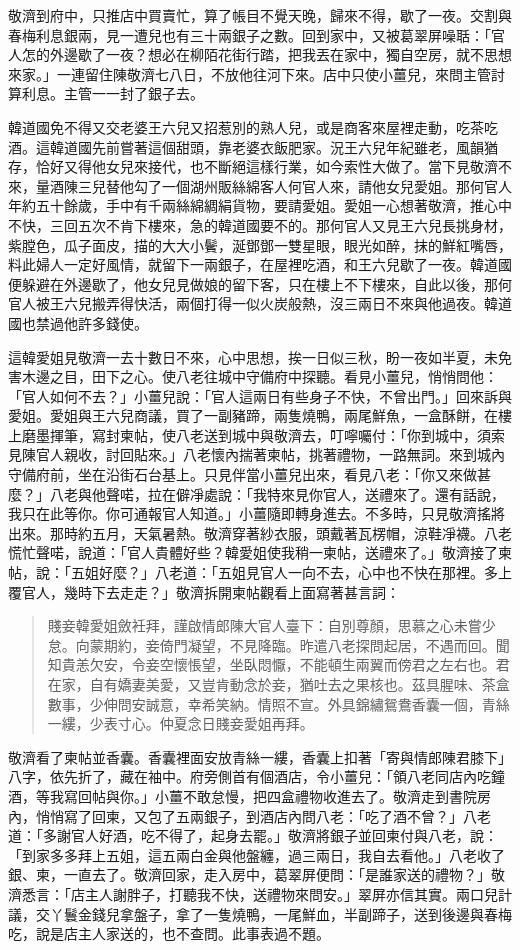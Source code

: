 敬濟到府中，只推店中買賣忙，算了帳目不覺天晚，歸來不得，歇了一夜。交割與春梅利息銀兩，見一遭兒也有三十兩銀子之數。回到家中，又被葛翠屏噪聒：「官人怎的外邊歇了一夜？想必在柳陌花街行踏，把我丟在家中，獨自空房，就不思想來家。」一連留住陳敬濟七八日，不放他往河下來。店中只使小薑兒，來問主管討算利息。主管一一封了銀子去。

韓道國免不得又交老婆王六兒又招惹別的熟人兒，或是商客來屋裡走動，吃茶吃酒。這韓道國先前嘗著這個甜頭，靠老婆衣飯肥家。況王六兒年紀雖老，風韻猶存，恰好又得他女兒來接代，也不斷絕這樣行業，如今索性大做了。當下見敬濟不來，量酒陳三兒替他勾了一個湖州販絲綿客人何官人來，請他女兒愛姐。那何官人年約五十餘歲，手中有千兩絲綿綢絹貨物，要請愛姐。愛姐一心想著敬濟，推心中不快，三回五次不肯下樓來，急的韓道國要不的。那何官人又見王六兒長挑身材，紫膛色，瓜子面皮，描的大大小鬢，涎鄧鄧一雙星眼，眼光如醉，抹的鮮紅嘴唇，料此婦人一定好風情，就留下一兩銀子，在屋裡吃酒，和王六兒歇了一夜。韓道國便躲避在外邊歇了，他女兒見做娘的留下客，只在樓上不下樓來，自此以後，那何官人被王六兒搬弄得快活，兩個打得一似火炭般熱，沒三兩日不來與他過夜。韓道國也禁過他許多錢使。

這韓愛姐見敬濟一去十數日不來，心中思想，挨一日似三秋，盼一夜如半夏，未免害木邊之目，田下之心。使八老往城中守備府中探聽。看見小薑兒，悄悄問他：「官人如何不去？」小薑兒說：「官人這兩日有些身子不快，不曾出門。」回來訴與愛姐。愛姐與王六兒商議，買了一副豬蹄，兩隻燒鴨，兩尾鮮魚，一盒酥餅，在樓上磨墨揮筆，寫封柬帖，使八老送到城中與敬濟去，叮嚀囑付：「你到城中，須索見陳官人親收，討回貼來。」八老懷內揣著柬帖，挑著禮物，一路無詞。來到城內守備府前，坐在沿街石台基上。只見伴當小薑兒出來，看見八老：「你又來做甚麼？」八老與他聲喏，拉在僻凈處說：「我特來見你官人，送禮來了。還有話說，我只在此等你。你可通報官人知道。」小薑隨即轉身進去。不多時，只見敬濟搖將出來。那時約五月，天氣暑熱。敬濟穿著紗衣服，頭戴著瓦楞帽，涼鞋凈襪。八老慌忙聲喏，說道：「官人貴體好些？韓愛姐使我稍一柬帖，送禮來了。」敬濟接了柬帖，說：「五姐好麼？」八老道：「五姐見官人一向不去，心中也不快在那裡。多上覆官人，幾時下去走走？」敬濟拆開柬帖觀看上面寫著甚言詞：
\begin{quote}
賤妾韓愛姐斂衽拜，謹啟情郎陳大官人臺下：自別尊顏，思慕之心未嘗少怠。向蒙期約，妾倚門凝望，不見降臨。昨遣八老探問起居，不遇而回。聞知貴恙欠安，令妾空懷悵望，坐臥悶懨，不能頓生兩翼而傍君之左右也。君在家，自有嬌妻美愛，又豈肯動念於妾，猶吐去之果核也。茲具腥味、茶盒數事，少伸問安誠意，幸希笑納。情照不宣。外具錦繡鴛鴦香囊一個，青絲一縷，少表寸心。仲夏念日賤妾愛姐再拜。
\end{quote}

敬濟看了柬帖並香囊。香囊裡面安放青絲一縷，香囊上扣著「寄與情郎陳君膝下」八字，依先折了，藏在袖中。府旁側首有個酒店，令小薑兒：「領八老同店內吃鐘酒，等我寫回帖與你。」小薑不敢怠慢，把四盒禮物收進去了。敬濟走到書院房內，悄悄寫了回柬，又包了五兩銀子，到酒店內問八老：「吃了酒不曾？」八老道：「多謝官人好酒，吃不得了，起身去罷。」敬濟將銀子並回柬付與八老，說：「到家多多拜上五姐，這五兩白金與他盤纏，過三兩日，我自去看他。」八老收了銀、柬，一直去了。敬濟回家，走入房中，葛翠屏便問：「是誰家送的禮物？」敬濟悉言：「店主人謝胖子，打聽我不快，送禮物來問安。」翠屏亦信其實。兩口兒計議，交丫鬟金錢兒拿盤子，拿了一隻燒鴨，一尾鮮血，半副蹄子，送到後邊與春梅吃，說是店主人家送的，也不查問。此事表過不題。

